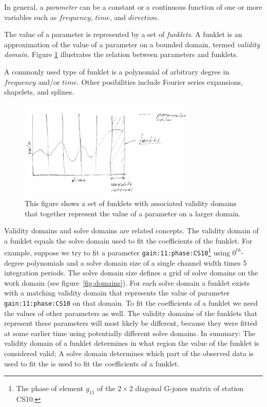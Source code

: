 \documentclass[10pt]{lofar}
\newcommand{\todo}[1]{\begin{center}\fbox{\parbox{0.9\textwidth}{\textbf{!!TODO!! #1}}}\end{center}}
\begin{document}
\todo{ref Hamaker, aips++ note of Jan N.}

In general, a \emph{parameter} can be a constant or a continuous function of one
or more variables such as $frequency$, $time$, and $direction$.

The value of a parameter is represented by a set of \emph{funklets}. A funklet
is an approximation of the value of a parameter on a bounded domain, termed
\emph{validity domain}. Figure \ref{fig:funklet} illustrates the relation
between parameters and funklets.

A commonly used type of funklet is a polynomial of arbitrary degree in
$frequency$ and/or $time$. Other posibilities include Fourier series expansions,
shapelets, and splines.

\begin{figure}[htbp]
\centering
\includegraphics[width=0.75\textwidth]{images/funklet.eps}
\caption{This figure shows a set of funklets with associated validity domains
that together represent the value of a parameter on a larger domain.}
\label{fig:funklet}
\end{figure}

Validity domains and solve domains are related concepts. The validity domain of
a funklet equals the solve domain used to fit the coefficients of the funklet.
For example, suppose we try to fit a parameter
\texttt{gain:11:phase:CS10}\footnote{The phase of element $g_{11}$ of the $2
\times 2$ diagonal G-jones matrix of station CS10.} using $0^{th}$-degree
polynomials and a solve domain size of a single channel width times 5
integration periods. The solve domain size defines a grid of solve domains on
the work domain (see figure~\ref{fig:domains}). For each solve domain a funklet
exists with a matching validity domain that represents the value of parameter
\texttt{gain:11:phase:CS10} on that domain. To fit the coefficients of a funklet
we need the values of other parameters as well. The validity domains of the
funklets that represent these parameters will most likely be different, because
they were fitted at some earlier time using potentially different solve domains.
In summary: The validity domain of a funklet determines in what region the value
of the funklet is considered valid; A solve domain determines which part of the
observed data is used to fit the is used to fit the coefficients of a funklet.
\end{document}
